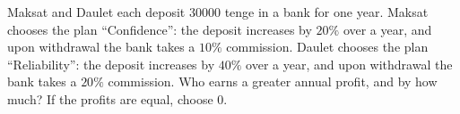 Maksat and Daulet each deposit $30000$ tenge in a bank for one year. Maksat chooses the plan ``Confidence'': the deposit increases by $20\%$ over a year, and upon withdrawal the bank takes a $10\%$ commission. Daulet chooses the plan ``Reliability'': the deposit increases by $40\%$ over a year, and upon withdrawal the bank takes a $20\%$ commission. Who earns a greater annual profit, and by how much? If the profits are equal, choose $0$.
